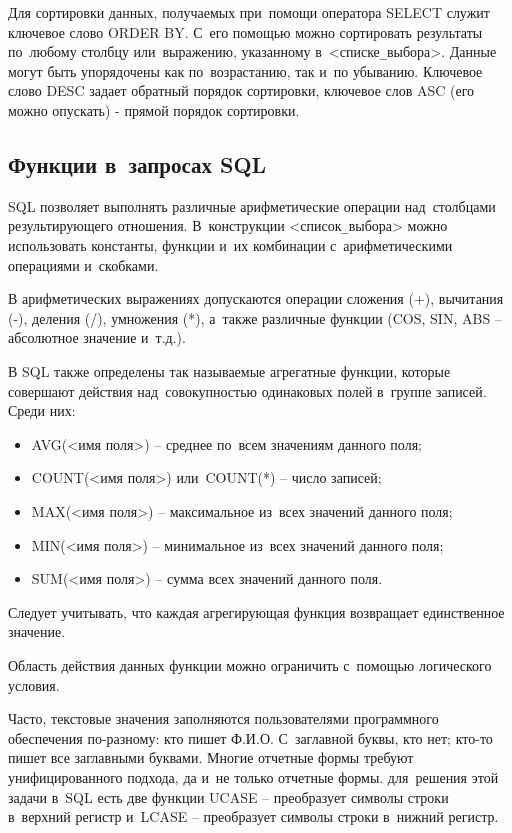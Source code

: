 \documentclass{ou}
\begin{document}
Для сортировки данных, получаемых при~помощи оператора SELECT служит ключевое слово ORDER BY. С~его помощью можно сортировать результаты по~любому столбцу или~выражению, указанному в~<списке\verb|_|выбора>. Данные могут быть упорядочены как по~возрастанию, так и~по убыванию. Ключевое слово DESC задает обратный порядок сортировки, ключевое слов ASC (его можно опускать) - прямой порядок сортировки.  
\subsection{Функции в~запросах SQL}
SQL позволяет выполнять различные арифметические операции над~столбцами результирующего отношения. В~конструкции <список\verb|_|выбора> можно использовать константы, функции и~их комбинации с~арифметическими операциями и~скобками. 

В арифметических выражениях допускаются операции сложения (+), вычитания (-), деления (/), умножения (*), а~также различные функции (COS, SIN, ABS -- абсолютное значение и~т.д.). 
 
В SQL также определены так называемые агрегатные функции, которые совершают действия над~совокупностью одинаковых полей в~группе записей. Среди них: 
\begin{itemize}[label=-, leftmargin=0em, itemindent=3.35em, nosep]
\item AVG(<имя поля>) -- среднее по~всем значениям данного поля;
\item COUNT(<имя поля>) или~COUNT(*) -- число записей;
\item MAX(<имя поля>) -- максимальное из~всех значений данного поля;
\item MIN(<имя поля>) -- минимальное из~всех значений данного поля;
\item SUM(<имя поля>) -- сумма всех значений данного поля.
\end{itemize}

Следует учитывать, что каждая агрегирующая функция возвращает единственное значение. 

Область действия данных функции можно ограничить с~помощью логического условия. 

Часто, текстовые значения заполняются пользователями программного обеспечения по-разному: кто пишет Ф.И.О. С~заглавной буквы, кто нет; кто-то пишет все заглавными буквами. Многие отчетные формы требуют унифицированного подхода, да и~не только отчетные формы. для~решения этой задачи в~SQL есть две функции UCASE -- преобразует символы строки в~верхний регистр и~LCASE -- преобразует символы строки в~нижний регистр. 
\end{document}
